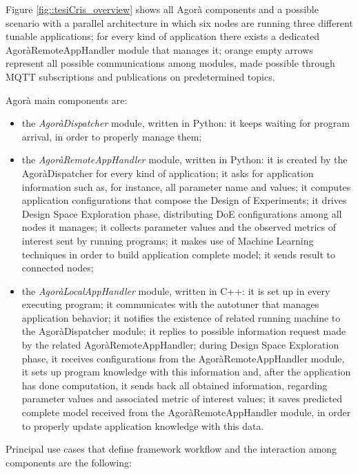 Figure \ref{fig::tesiCris_overview} shows all Agorà components and a possible scenario with a parallel architecture in which six nodes are running three different tunable applications; for every kind of application there exists a dedicated AgoràRemoteAppHandler module that manages it; orange empty arrows represent all possible communications among modules, made possible through MQTT subscriptions and publications on predetermined topics.

Agorà main components are:

\begin{itemize}

    \item the \textit{AgoràDispatcher} module, written in Python: it keeps waiting for program arrival, in order to properly manage them;
    
    \item the \textit{AgoràRemoteAppHandler} module, written in Python: it is created by the AgoràDispatcher for every kind of application; it asks for application information such as, for instance, all parameter name and values; it computes application configurations that compose the Design of Experiments; it drives Design Space Exploration phase, distributing DoE configurations among all nodes it manages; it collects parameter values and the observed metrics of interest sent by running programs; it makes use of Machine Learning techniques in order to build application complete model; it sends result to connected nodes;
    
    \item the \textit{AgoràLocalAppHandler} module, written in C++: it is set up in every executing program; it communicates with the autotuner that manages application behavior; it notifies the existence of related running machine to the AgoràDispatcher module; it replies to possible information request made by the related AgoràRemoteAppHandler; during Design Space Exploration phase, it receives configurations from the AgoràRemoteAppHandler module, it sets up program knowledge with this information and, after the application has done computation, it sends back all obtained information, regarding parameter values and associated metric of interest values; it saves predicted complete model received from the AgoràRemoteAppHandler module, in order to properly update application knowledge with this data.

\end{itemize}

Principal use cases that define framework workflow and the interaction among components are the following:

